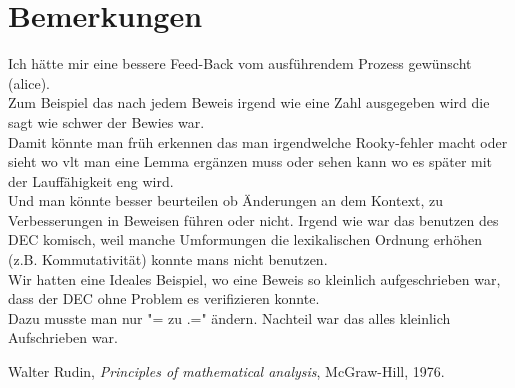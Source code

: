 \documentclass{article}
\begin{document}
\section{Bemerkungen}

Ich h\"atte mir eine bessere Feed-Back vom ausf\"uhrendem Prozess gew\"unscht (alice).\\
Zum Beispiel das nach jedem Beweis irgend wie eine Zahl ausgegeben wird die sagt wie schwer der Bewies war.\\
Damit k\"onnte man fr\"uh erkennen das man irgendwelche Rooky-fehler macht oder sieht wo vlt man eine Lemma erg\"anzen muss oder sehen kann wo es sp\"ater mit der Lauff\"ahigkeit eng wird.\\
Und man k\"onnte besser beurteilen ob \"Anderungen an dem Kontext, zu Verbesserungen in Beweisen f\"uhren oder nicht.
Irgend wie war das benutzen des DEC komisch, weil manche Umformungen die lexikalischen Ordnung erh\"ohen (z.B. Kommutativit\"at) konnte mans nicht benutzen.\\
Wir hatten eine Ideales Beispiel, wo eine Beweis so kleinlich aufgeschrieben war, dass der DEC ohne Problem es verifizieren konnte.\\
Dazu musste man nur "= zu .=" \"andern. Nachteil war das alles kleinlich Aufschrieben war.\\



\begin{thebibliography}{1}

  Walter Rudin,
  \textit{Principles of mathematical analysis},
  McGraw-Hill,
  1976.

\end{thebibliography}
  
\end{document}

